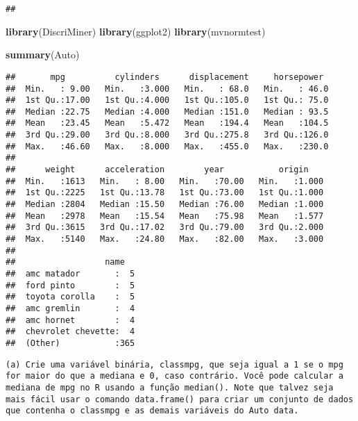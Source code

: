 \documentclass[]{article}
\newenvironment{Shaded}{\begin{snugshade}}{\end{snugshade}}
\newcommand{\KeywordTok}[1]{\textcolor[rgb]{0.13,0.29,0.53}{\textbf{#1}}}
\newcommand{\NormalTok}[1]{#1}
\begin{document}
\begin{verbatim}
## 
\end{verbatim}

\begin{Shaded}
\begin{Highlighting}[]
\KeywordTok{library}\NormalTok{(DiscriMiner)}
\KeywordTok{library}\NormalTok{(ggplot2)}
\KeywordTok{library}\NormalTok{(mvnormtest)}
\end{Highlighting}
\end{Shaded}

\begin{Shaded}
\begin{Highlighting}[]
\KeywordTok{summary}\NormalTok{(Auto)}
\end{Highlighting}
\end{Shaded}

\begin{verbatim}
##       mpg          cylinders      displacement     horsepower   
##  Min.   : 9.00   Min.   :3.000   Min.   : 68.0   Min.   : 46.0  
##  1st Qu.:17.00   1st Qu.:4.000   1st Qu.:105.0   1st Qu.: 75.0  
##  Median :22.75   Median :4.000   Median :151.0   Median : 93.5  
##  Mean   :23.45   Mean   :5.472   Mean   :194.4   Mean   :104.5  
##  3rd Qu.:29.00   3rd Qu.:8.000   3rd Qu.:275.8   3rd Qu.:126.0  
##  Max.   :46.60   Max.   :8.000   Max.   :455.0   Max.   :230.0  
##                                                                 
##      weight      acceleration        year           origin     
##  Min.   :1613   Min.   : 8.00   Min.   :70.00   Min.   :1.000  
##  1st Qu.:2225   1st Qu.:13.78   1st Qu.:73.00   1st Qu.:1.000  
##  Median :2804   Median :15.50   Median :76.00   Median :1.000  
##  Mean   :2978   Mean   :15.54   Mean   :75.98   Mean   :1.577  
##  3rd Qu.:3615   3rd Qu.:17.02   3rd Qu.:79.00   3rd Qu.:2.000  
##  Max.   :5140   Max.   :24.80   Max.   :82.00   Max.   :3.000  
##                                                                
##                  name    
##  amc matador       :  5  
##  ford pinto        :  5  
##  toyota corolla    :  5  
##  amc gremlin       :  4  
##  amc hornet        :  4  
##  chevrolet chevette:  4  
##  (Other)           :365
\end{verbatim}

\begin{verbatim}
(a) Crie uma variável binária, classmpg, que seja igual a 1 se o mpg for maior do que a mediana e 0, caso contrário. Você pode calcular a mediana de mpg no R usando a função median(). Note que talvez seja mais fácil usar o comando data.frame() para criar um conjunto de dados que contenha o classmpg e as demais variáveis do Auto data.
\end{verbatim}
\end{document}
